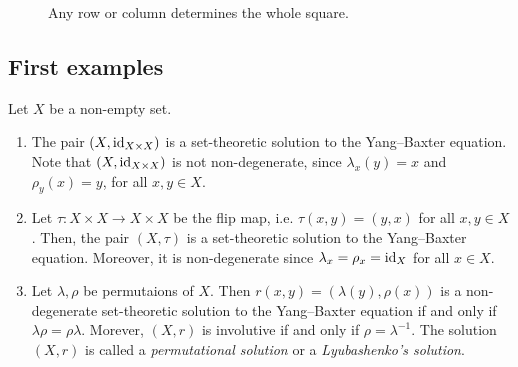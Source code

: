     \begin{figure}[h!]
    \centering
        \hspace{1cm}
        \caption{Any row or column determines the whole square.}
        \label{fig:braid}
    \end{figure}

\subsection{First examples}
    \begin{examples}
        Let $X$ be a non-empty set.  
        \begin{enumerate}
            \item The pair $(X,\operatorname{id}_{X\times X})$ is a  set-theoretic solution to the  Yang--Baxter equation. Note that $(X,\operatorname{id}_{X\times X})$ is not non-degenerate, since $\lambda_x(y)=x$ and $\rho_y(x)=y$, for all $x,y\in X$.
            \item Let $\tau: X \times X \to X \times X$ be the flip map, i.e. $\tau(x,y)=(y,x)$ for all $x,y \in X$. Then, the pair $(X,\tau)$ is a set-theoretic solution to the Yang--Baxter equation. Moreover, it is non-degenerate since $\lambda_x=\rho_x=\operatorname{id}_X$ for all $x\in X$.
            \item Let $\lambda, \rho$ be permutaions of $X$. Then $r(x,y)=(\lambda(y),\rho(x))$ is a
            non-degenerate set-theoretic solution to the Yang--Baxter equation if and only if $\lambda\rho = \rho\lambda$.
            Morever, $(X , r )$ is involutive if and only if $\rho = \lambda^{-1}$. The solution 
            $(X,r)$ is called a \emph{permutational solution} or a \emph{Lyubashenko's solution}.
        \end{enumerate}
    \end{examples}

